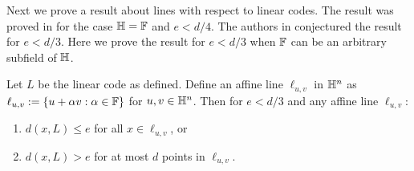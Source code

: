 Next we prove a result about lines with respect to linear codes. The result was proved in \cite{ligero} for the case $\mathbb{H}=\mathbb{F}$ and $e<d/4$. The authors in \cite{ligero} conjectured the result for $e<d/3$. Here we prove the result for $e<d/3$ when $\mathbb{F}$ can be an arbitrary subfield of $\mathbb{H}$.
\begin{lemma}\label{lem:affineline}
	Let $L$ be the linear code as defined. Define an affine line $\ell_{u,v}$ in $\mathbb{H}^n$ as $\ell_{u,v} := \{u + \alpha v:\alpha\in \mathbb{F}\}$ for $u,v\in \mathbb{H}^n$. Then for $e < d/3$ and any affine line $\ell_{u,v}$:
	\begin{enumerate}[{\rm (i)}]
		\item $d(x,L)\leq e$ for all $x\in \ell_{u,v}$, or
		\item $d(x,L)> e$ for at most $d$ points in $\ell_{u,v}$.
	\end{enumerate}
\end{lemma}
